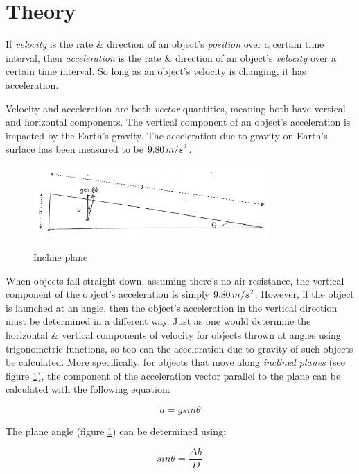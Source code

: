 
\section{Theory}
\vspace{-0.5cm}
\singlespacing

\indent If \textit{velocity} is the rate \& direction of an object's \textit{position} over a certain time interval, then \textit{acceleration} is the rate \& direction of an object's \textit{velocity} over a certain time interval. So long as an object's velocity is changing, it has acceleration.\par 


Velocity and acceleration are both \textit{vector} quantities, meaning both have vertical and horizontal components. The vertical component of an object's acceleration is impacted by the Earth's gravity. The acceleration due to gravity on Earth's surface has been measured to be \textit{$9.80\thinspace{m/s^2}$}. \par

\begin{figure}[h!]
    \centering
    \includegraphics[width=0.8\textwidth]{figure1_inclineplane} %
    \caption{Incline plane}
    \label{fig:inclineplane}
\end{figure}

When objects fall straight down, assuming there's no air resistance, the vertical component of the object's acceleration is simply $9.80\thinspace{m/s^2}$. However, if the object is launched at an angle, then the object's acceleration in the vertical direction must be determined in a different way. Just as one would determine the horizontal \& vertical components of velocity for objects thrown at angles using trigonometric functions, so too can the acceleration due to gravity of such objects be calculated. More specifically, for objects that move along \textit{inclined planes} (see figure \ref{fig:inclineplane}), the component of the acceleration vector parallel to the plane can be calculated with the following equation:

\begin{equation}
a = gsin\theta
\label{eq:1}
\end{equation}

The plane angle (figure \ref{fig:inclineplane}) can be determined using:

\begin{equation}	
sin\theta = \frac{\Delta{h}}{D}
\label{eq:2}
\end{equation}

\newpage

